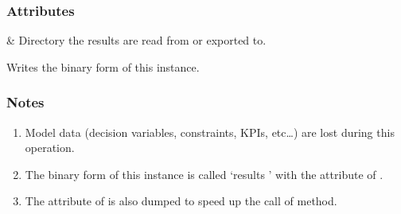 \documentclass[letterpaper,10pt,english]{sphinxmanual}
\begin{document}
\begin{fulllineitems}
\subsubsection*{Attributes}


\begin{savenotes}\sphinxattablestart
\centering
\begin{tabulary}{\linewidth}[t]{}
\hline

\sphinxAtStartPar
{\hyperref[\detokenize{generated/tamos.data_IO.ResultsExport:tamos.data_IO.ResultsExport.working_dir}]{}}
&
\sphinxAtStartPar
Directory the results are read from or exported to.
\\
\hline
\end{tabulary}
\par
\sphinxattableend\end{savenotes}

\begin{fulllineitems}
\label{\detokenize{generated/tamos.data_IO.ResultsExport:tamos.data_IO.ResultsExport.dump_object}}
\pysigstartsignatures
{}
\pysigstopsignatures
\sphinxAtStartPar
Writes the binary form of this instance.
\subsubsection*{Notes}
\begin{enumerate}
%
\item {} 
\sphinxAtStartPar
Model data (decision variables, constraints, KPIs, etc…) are lost during this operation.

\item {} 
\sphinxAtStartPar
The binary form of this instance is called ‘results ’ with  the  attribute of .

\item {} 
\sphinxAtStartPar
The  attribute of  is also dumped to speed up the call of  method.

\end{enumerate}

\end{fulllineitems}


\end{fulllineitems}
\end{document}
